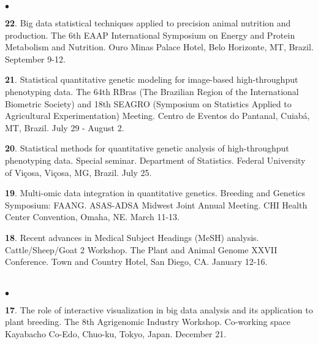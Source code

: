 \documentclass[margin,line,10pt]{res}
\newenvironment{list2}{
  \begin{list}{$\bullet$}{%
      \setlength{\itemsep}{0in}
      \setlength{\parsep}{0in} \setlength{\parskip}{0in}
      \setlength{\topsep}{0in} \setlength{\partopsep}{0in} 
      \setlength{\leftmargin}{0.2in}}}{\end{list}}
\begin{document}
\begin{resume}
\begin{list2}
\item [{\bf 22}.]  Big data statistical techniques applied to precision animal nutrition and production. The 6th EAAP International Symposium on Energy and Protein Metabolism and Nutrition. Ouro Minas Palace Hotel, Belo Horizonte, MT, Brazil. September 9-12.

  \vspace{0.5cm}
  
 \item [{\bf 21}.] Statistical quantitative genetic modeling for image-based high-throughput phenotyping data. The 64th RBras (The Brazilian  Region  of the International Biometric Society) and 18th SEAGRO (Symposium on Statistics Applied to Agricultural Experimentation) Meeting. Centro de Eventos do Pantanal, Cuiab{\'a}, MT, Brazil. July 29 - August 2.

   \vspace{0.5cm}

   
 \item [{\bf 20}.]      
     Statistical methods for quantitative genetic analysis of high-throughput phenotyping data. Special seminar. Department of Statistics. Federal University of Vi\c cosa, Vi\c cosa, MG, Brazil. July 25.
   
    
   \vspace{0.5cm}
   
   \item [{\bf 19}.]  Multi-omic data integration in quantitative genetics. Breeding and Genetics Symposium: FAANG. ASAS-ADSA Midwest Joint Annual Meeting. CHI Health Center Convention, Omaha, NE. March 11-13.

  \vspace{0.5cm}

 \item [{\bf 18}.] Recent advances in Medical Subject Headings (MeSH) analysis. Cattle/Sheep/Goat 2 Workshop. The Plant and Animal Genome XXVII Conference. Town and Country Hotel, San Diego, CA. January 12-16.

\end{list2}

  
  
\section{}
\begin{list2}

  \item [{\bf 17}.] The role of interactive visualization in big data analysis and its application to plant breeding. The 8th Agrigenomic Industry Workshop. Co-working space Kayabacho Co-Edo, Chuo-ku, Tokyo, Japan. December 21.


\end{list2}
\end{resume}
\end{document}
